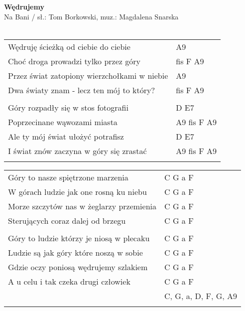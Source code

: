 \documentclass[a5paper]{article}
\begin{document}


\noindent
\fontsize{12pt}{15pt}\selectfont
\textbf{Wędrujemy} \\
\fontsize{8pt}{10pt}\selectfont
Na Bani / sł.: Tom Borkowski, muz.: Magdalena Snarska\\ \\
\fontsize{10pt}{12pt}\selectfont
{}
\begin{tabular}{@{}p{7.50cm}p{3cm}@{}}
\noindent
Wędruję ścieżką od ciebie do ciebie	& A9 \\
Choć droga prowadzi tylko przez góry & fis F A9 \\
Przez świat zatopiony wierzchołkami w niebie & A9 \\
Dwa światy znam - lecz ten mój to który? & fis F A9 \\ \\

Góry rozpadły się w stos fotografii & D E7 \\
Poprzecinane wąwozami miasta & A9 fis F A9 \\
Ale ty mój świat ułożyć potrafisz & D E7 \\
I świat znów zaczyna w góry się zrastać	& A9 fis F A9 \\ \\
\end{tabular}

\noindent
\begin{tabular}{@{}p{6.50cm}p{3cm}@{}}
Góry to nasze spiętrzone marzenia & C G a F \\
W górach ludzie jak one rosną ku niebu & C G a F \\
Morze szczytów nas w żeglarzy przemienia & C G a F \\
Sterujących coraz dalej od brzegu & C G a F \\ \\

Góry to ludzie którzy je niosą w plecaku & C G a F \\
Ludzie są jak góry które noszą w sobie & C G a F \\
Gdzie oczy poniosą wędrujemy szlakiem & C G a F \\
A u celu i tak czeka drugi człowiek & C G a F \\
& C, G, a, D, F, G, A9 \\ \\
\end{tabular}
\end{document}
